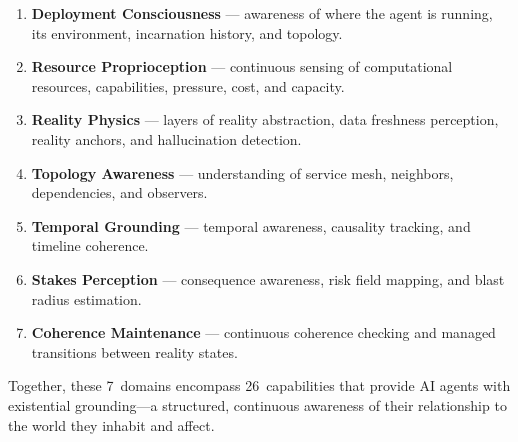 \documentclass[10pt, twocolumn]{article}
\begin{document}
\begin{enumerate}[nosep, leftmargin=*]
  \item \textbf{Deployment Consciousness} --- awareness of where the agent is running, its environment, incarnation history, and topology.
  \item \textbf{Resource Proprioception} --- continuous sensing of computational resources, capabilities, pressure, cost, and capacity.
  \item \textbf{Reality Physics} --- layers of reality abstraction, data freshness perception, reality anchors, and hallucination detection.
  \item \textbf{Topology Awareness} --- understanding of service mesh, neighbors, dependencies, and observers.
  \item \textbf{Temporal Grounding} --- temporal awareness, causality tracking, and timeline coherence.
  \item \textbf{Stakes Perception} --- consequence awareness, risk field mapping, and blast radius estimation.
  \item \textbf{Coherence Maintenance} --- continuous coherence checking and managed transitions between reality states.
\end{enumerate}

Together, these 7~domains encompass 26~capabilities that provide AI agents with existential grounding---a structured, continuous awareness of their relationship to the world they inhabit and affect.
\end{document}
